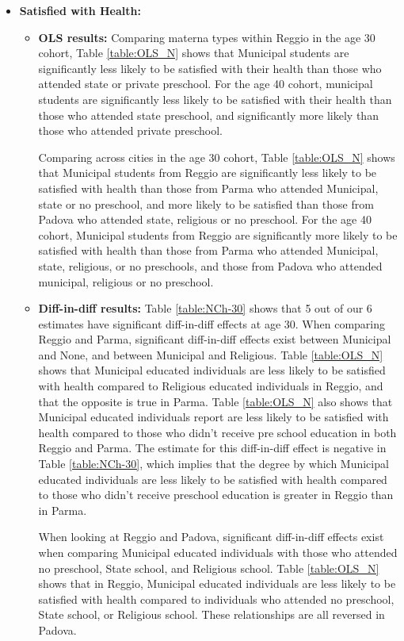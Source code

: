 \documentclass[11pt]{article}
\begin{document}
\begin{itemize}
\item \textbf{Satisfied with Health:} 
	
	\begin{itemize}
	\item \textbf{OLS results:} Comparing materna types within Reggio in the age 30 cohort, Table \ref{table:OLS_N} shows that Municipal students are significantly less likely to be satisfied with their health than those who attended state or private preschool. For the age 40 cohort, municipal students are significantly less likely to be satisfied with their health than those who attended state preschool, and significantly more likely than those who attended private preschool.

	Comparing across cities in the age 30 cohort, Table \ref{table:OLS_N} shows that Municipal students from Reggio are significantly less likely to be satisfied with health than those from Parma who attended Municipal, state or no preschool, and more likely to be satisfied than those from Padova who attended state, religious or no preschool. For the age 40 cohort, Municipal students from Reggio are significantly more likely to be satisfied with health than those from Parma who attended Municipal, state, religious, or no preschools, and those from Padova who attended municipal, religious or no preschool.
	
	\item \textbf{Diff-in-diff results:}  Table \ref{table:NCh-30} shows that 5 out of our 6 estimates have significant diff-in-diff effects at age 30. When comparing Reggio and Parma, significant diff-in-diff effects exist between Municipal and None, and between Municipal and Religious. Table \ref{table:OLS_N} shows that Municipal educated individuals are less likely to be satisfied with health compared to Religious educated individuals in Reggio, and that the opposite is true in Parma.  Table \ref{table:OLS_N} also shows that  Municipal educated individuals report are less likely to be satisfied with health compared to those who didn't receive pre school education in both Reggio and Parma. The estimate for this diff-in-diff effect is negative in Table \ref{table:NCh-30}, which implies that the degree by which Municipal educated individuals are less likely to be satisfied with health compared to those who didn't receive preschool education is greater in Reggio than in Parma.
	
	 When looking at Reggio and Padova, significant diff-in-diff effects exist when comparing Municipal educated individuals with those who attended no preschool, State school, and Religious school. Table \ref{table:OLS_N} shows that in Reggio, Municipal educated individuals are less likely to be satisfied with health compared to individuals who attended no preschool, State school, or Religious school. These relationships are all reversed in Padova. 
	

\end{itemize}
\end{itemize}
\end{document}
